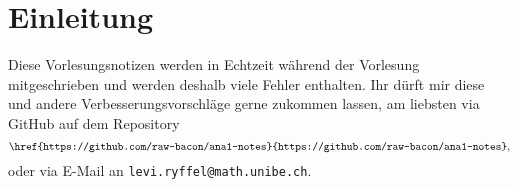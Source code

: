 \documentclass[../main.tex]{subfiles}
\begin{document}
\chapter*{Einleitung}
Diese Vorlesungsnotizen werden in Echtzeit während der Vorlesung mitgeschrieben
und werden deshalb viele Fehler enthalten.
Ihr dürft mir diese und andere Verbesserungsvorschläge
gerne zukommen lassen, am liebsten via GitHub
auf dem Repository
\[
\texttt{\href{https://github.com/raw-bacon/ana1-notes}{https://github.com/raw-bacon/ana1-notes}},
\]
oder via E-Mail an \texttt{levi.ryffel@math.unibe.ch}.
\end{document}
